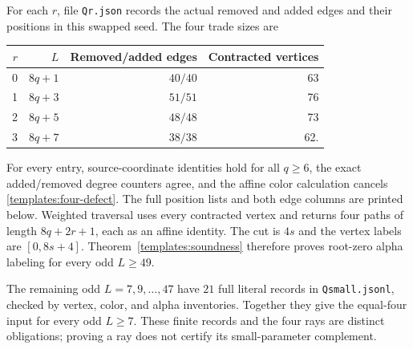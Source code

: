 For each $r$, file \texttt{Qr.json} records the actual removed and
added edges and their positions in this swapped seed.  The four
trade sizes are
\begin{center}
\begin{tabular}{r|r|r|r}
$r$ & $L$ & Removed/added edges & Contracted vertices\\\hline
0 & $8q+1$ & $40/40$ &63\\
1 & $8q+3$ & $51/51$ &76\\
2 & $8q+5$ & $48/48$ &73\\
3 & $8q+7$ & $38/38$ &62.
\end{tabular}
\end{center}
For every entry, source-coordinate identities hold for all $q\ge6$,
the exact added/removed degree counters agree, and the affine color
calculation cancels \eqref{templates:four-defect}.  The full position
lists and both edge columns are printed below.  Weighted traversal
uses every contracted vertex and returns four paths of length
$8q+2r+1$, each as an affine identity.  The cut is $4s$ and the
vertex labels are $[0,8s+4]$.  Theorem~\ref{templates:soundness}
therefore proves root-zero alpha labeling for every odd $L\ge49$.

The remaining odd $L=7,9,\ldots,47$ have $21$ full literal records
in \texttt{Qsmall.jsonl}, checked by vertex, color, and alpha
inventories.  Together they give the equal-four input for every odd
$L\ge7$.  These finite records and the four rays are distinct
obligations; proving a ray does not certify its small-parameter
complement.





